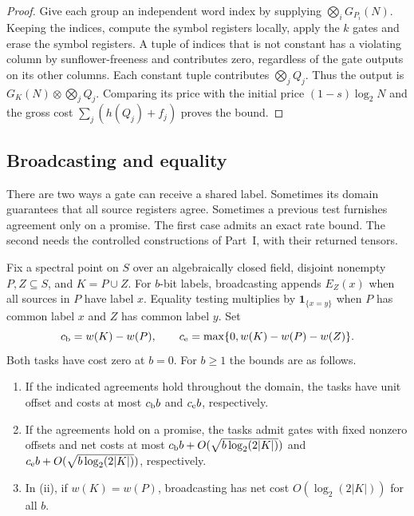 \begin{proof}
Give each group an independent word index by supplying
\(\bigotimes_i G_{P_i}(N)\). Keeping the indices, compute the symbol
registers locally, apply the \(k\) gates and erase the symbol
registers. A tuple of indices that is not constant has a violating
column by sunflower-freeness and contributes zero, regardless of the gate
outputs on its other columns. Each constant tuple contributes
\(\bigotimes_j Q_j\). Thus the output is
\(G_K(N)\otimes\bigotimes_j Q_j\). Comparing its price with the initial
price \((1-s)\log_2 N\) and the gross cost
\(\sum_j(h(Q_j)+f_j)\) proves the bound.
\end{proof}

\subsection{Broadcasting and equality}

There are two ways a gate can receive a shared label. Sometimes its
domain guarantees that all source registers agree. Sometimes a
previous test furnishes agreement only on a promise. The first case
admits an exact rate bound. The second needs the controlled
constructions of Part~I, with their returned tensors.

\begin{lemma}\label{lem:broadcast}
Fix a spectral point on \(S\) over an algebraically closed field,
disjoint nonempty \(P,Z\subseteq S\), and \(K=P\cup Z\).
For \(b\)-bit labels, broadcasting appends \(E_Z(x)\) when all sources
in \(P\) have label \(x\). Equality testing multiplies by
\(\mathbf 1_{\{x=y\}}\) when \(P\) has common label \(x\) and \(Z\)
has common label \(y\). Set
\[
 c_{\rm b}=w(K)-w(P),\qquad
 c_{\rm e}=\max\{0,w(K)-w(P)-w(Z)\}.
\]
Both tasks have cost zero at \(b=0\). For \(b\ge1\) the bounds are
as follows.
\begin{enumerate}
\item[(i)] If the indicated agreements hold throughout the domain,
the tasks have unit offset and costs at most \(c_{\rm b}b\) and
\(c_{\rm e}b\), respectively.
\item[(ii)] If the agreements hold on a promise, the tasks admit
gates with fixed nonzero offsets and net costs at most
\(c_{\rm b}b+O(\sqrt{b\log_2(2|K|)})\) and
\(c_{\rm e}b+O(\sqrt{b\log_2(2|K|)})\), respectively.
\item[(iii)] In (ii), if \(w(K)=w(P)\), broadcasting has net cost
\(O(\log_2(2|K|))\) for all \(b\).
\end{enumerate}
\end{lemma}

